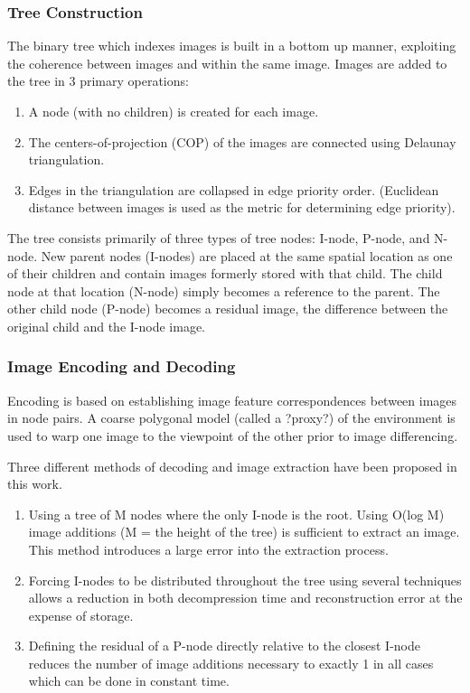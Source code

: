 \subsubsection{Tree Construction}
The binary tree which indexes images is built in a bottom up manner, exploiting the coherence between images and within the same image. 
Images are added to the tree in 3 primary operations:

\begin{enumerate}
\item{A node (with no children) is created for each image. }
\item{The centers-of-projection (COP) of the images are connected using Delaunay triangulation. }
\item{Edges in the triangulation are collapsed in edge priority order. (Euclidean distance between images is used as the metric for determining edge priority).}
\end{enumerate}

The tree consists primarily of three types of tree nodes: I-node, P-node, and N-node. New parent nodes (I-nodes) are placed at the same spatial location as one of their children and contain images formerly stored with that child. The child node at that location (N-node) simply becomes a reference to the parent. The other child node (P-node) becomes a residual image, the difference between the original child and the I-node image.

\subsubsection{Image Encoding and Decoding}
Encoding is based on establishing image feature correspondences between images in node pairs. A coarse polygonal model (called a ?proxy?) of the environment is used to warp one image to the viewpoint of the other prior to image differencing.

Three different methods of decoding and image extraction have been proposed in this work.

\begin{enumerate}
\item{Using a tree of M nodes where the only I-node is the root. Using O(log M) image additions (M = the height of the tree) is sufficient to extract an image. This method introduces a large error into the extraction process.}
\item{Forcing I-nodes to be distributed throughout the tree using several techniques allows a reduction in both decompression time and reconstruction error at the expense of storage.}
\item{Defining the residual of a P-node directly relative to the closest I-node reduces the number of image additions necessary to exactly 1 in all cases which can be done in constant time.}
\end{enumerate}

